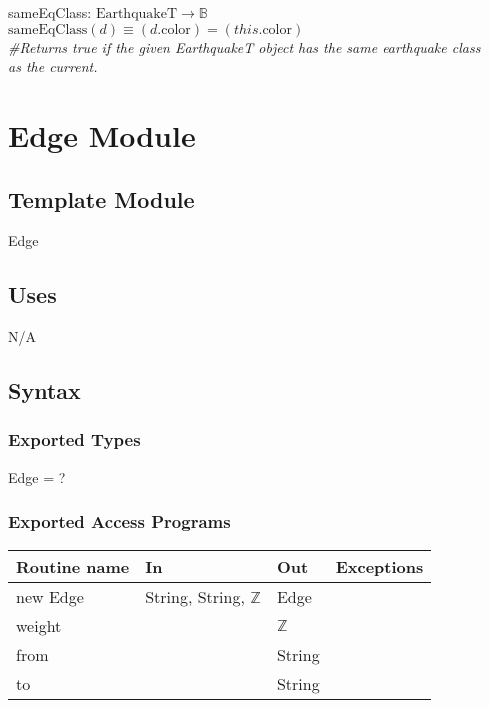 \documentclass[12pt]{article}
\begin{document}
\noindent sameEqClass: $\mbox{EarthquakeT} \rightarrow \mathbb{B}$\\
$\mbox{sameEqClass}(d) \equiv (d.\mbox{color}) = (this.\mbox{color})$\\
\noindent \textit{\#Returns true if the given EarthquakeT object has the same earthquake class\\
as the current.}


\newpage

\section* {Edge Module}

\subsection* {Template Module}

Edge

\subsection* {Uses}

N/A

\subsection* {Syntax}

\subsubsection* {Exported Types}

Edge = ?


\subsubsection* {Exported Access Programs}

\begin{tabular}{| l | l | l | p{6cm} |}
\hline
\textbf{Routine name} & \textbf{In} & \textbf{Out} & \textbf{Exceptions}\\
\hline
new Edge & String, String, $\mathbb{Z}$ & Edge & \\
\hline
weight & ~ & $\mathbb{Z}$ & \\
\hline
from & ~ & String & \\
\hline
to & ~ & String & \\
\hline
\end{tabular}
\end{document}

